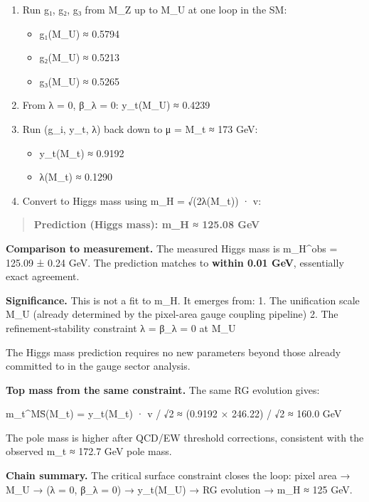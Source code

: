\documentclass[11pt,a4paper]{article}
\theoremstyle{remark}
\providecommand{\tightlist}{%
  \setlength{\itemsep}{0pt}\setlength{\parskip}{0pt}}
\begin{document}
\begin{enumerate}
\def\labelenumi{\arabic{enumi}.}
\item
  Run g₁, g₂, g₃ from M\_Z up to M\_U at one loop in the SM:

  \begin{itemize}
  \tightlist
  \item
    g₁(M\_U) ≈ 0.5794
  \item
    g₂(M\_U) ≈ 0.5213
  \item
    g₃(M\_U) ≈ 0.5265
  \end{itemize}
\item
  From λ = 0, β\_λ = 0: y\_t(M\_U) ≈ 0.4239
\item
  Run (g\_i, y\_t, λ) back down to μ = M\_t ≈ 173 GeV:

  \begin{itemize}
  \tightlist
  \item
    y\_t(M\_t) ≈ 0.9192
  \item
    λ(M\_t) ≈ 0.1290
  \end{itemize}
\item
  Convert to Higgs mass using m\_H = √(2λ(M\_t)) · v:
\end{enumerate}

\begin{quote}
\textbf{Prediction (Higgs mass): m\_H ≈ 125.08 GeV}
\end{quote}

\textbf{Comparison to measurement.} The measured Higgs mass is m\_H\^{}obs = 125.09 ± 0.24 GeV. The prediction matches to \textbf{within 0.01 GeV}, essentially exact agreement.

\textbf{Significance.} This is not a fit to m\_H. It emerges from:
1. The unification scale M\_U (already determined by the pixel-area gauge coupling pipeline)
2. The refinement-stability constraint λ = β\_λ = 0 at M\_U

The Higgs mass prediction requires no new parameters beyond those already committed to in the gauge sector analysis.

\textbf{Top mass from the same constraint.} The same RG evolution gives:

m\_t\^{}MS̄(M\_t) = y\_t(M\_t) · v / √2 ≈ (0.9192 × 246.22) / √2 ≈ 160.0 GeV

The pole mass is higher after QCD/EW threshold corrections, consistent with the observed m\_t ≈ 172.7 GeV pole mass.

\textbf{Chain summary.} The critical surface constraint closes the loop: pixel area → M\_U → (λ = 0, β\_λ = 0) → y\_t(M\_U) → RG evolution → m\_H ≈ 125 GeV.
\end{document}
